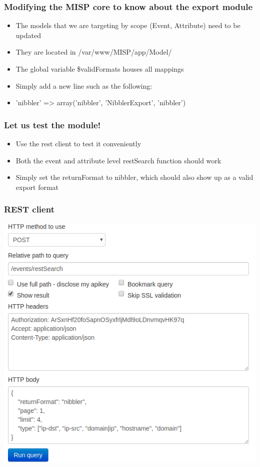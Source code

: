 \begin{frame}[fragile]
  \frametitle{Modifying the MISP core to know about the export module}
  \begin{itemize}
    \item The models that we are targeting by scope (Event, Attribute) need to be updated
    \item They are located in /var/www/MISP/app/Model/
    \item The global variable \$validFormats houses all mappings
    \item Simply add a new line such as the following:
    \item 'nibbler' => array('nibbler', 'NibblerExport', 'nibbler')
  \end{itemize}
\end{frame}

\begin{frame}[fragile]
  \frametitle{Let us test the module!}
  \begin{itemize}
    \item Use the rest client to test it conveniently
    \item Both the event and attribute level restSearch function should work
    \item Simply set the returnFormat to nibbler, which should also show up as a valid export format
  \end{itemize}
\end{frame}

\begin{frame}
  \frametitle{REST client}
  \begin{center}
    \includegraphics[scale=0.5]{nibbler_rest_client.png}
  \end{center}
\end{frame}


